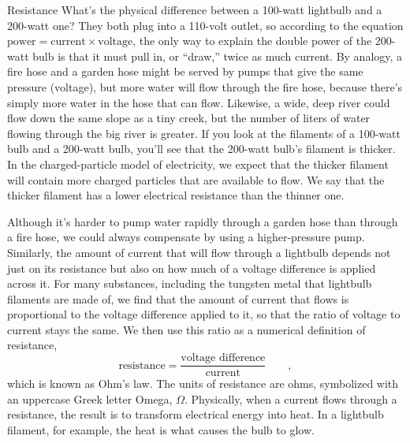 \begin{envsubsection}{Resistance}
%
What's the physical difference between a 100-watt lightbulb and a 200-watt one?
They both plug into a 110-volt outlet, so according to the equation
$\text{power} = \text{current} \times \text{voltage}$, the only way to explain the
double power of the 200-watt bulb is that it must pull in, or ``draw,''
twice as much current. By analogy, a fire hose and a garden hose might
be served by pumps that give the same pressure (voltage), but more water
will flow through the fire hose, because there's simply more water in the hose
that can flow. Likewise, a wide, deep river could flow down the same slope
as a tiny creek, but the number of liters of water flowing through the big
river is greater. If you look at the filaments of a 100-watt bulb and a 200-watt
bulb, you'll see that the 200-watt bulb's filament is thicker. In the charged-particle
model of electricity, we expect that the thicker filament will contain more
charged particles that are available to flow. We say that the thicker
filament has a lower electrical resistance than the thinner one.


Although it's harder to pump water rapidly through a garden hose than through
a fire hose, we could always compensate by using a higher-pressure pump.
Similarly, the amount of current that will flow through a lightbulb
depends not just on its resistance but also on how much of a voltage difference
is applied across it. For many substances, including the tungsten metal that
lightbulb filaments are made of, we find that the amount of current that flows
is proportional to the voltage difference applied to it, so that the ratio
of voltage to current stays the same. We then use this ratio as a numerical
definition of resistance,
\begin{equation*}
	\text{resistance} = \frac{\text{voltage difference}}{\text{current}} \qquad ,
\end{equation*}
which is known as Ohm's law.
The units of resistance are ohms, symbolized with an uppercase Greek letter
Omega, $\Omega$. Physically, when a current flows through a resistance,
the result is to transform electrical energy into heat. In a lightbulb filament,
for example, the heat is what causes the bulb to glow.


\end{envsubsection}
